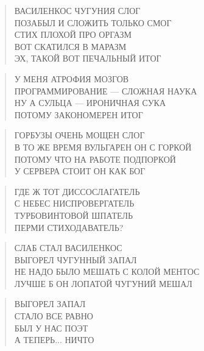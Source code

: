 \poemtitle{***}
\begin{verse}
ВАСИЛЕНКОС ЧУГУНИЯ СЛОГ\\
ПОЗАБЫЛ И СЛОЖИТЬ ТОЛЬКО СМОГ\\
СТИХ ПЛОХОЙ ПРО ОРГАЗМ\\
ВОТ СКАТИЛСЯ В МАРАЗМ\\
ЭХ, ТАКОЙ ВОТ ПЕЧАЛЬНЫЙ ИТОГ
\end{verse}

\poemtitle{***}
\begin{verse}
У МЕНЯ АТРОФИЯ МОЗГОВ\\
ПРОГРАММИРОВАНИЕ — СЛОЖНАЯ НАУКА\\
НУ А СУЛЬЦА — ИРОНИЧНАЯ СУКА\\
ПОТОМУ ЗАКОНОМЕРЕН ИТОГ
\end{verse}

\poemtitle{***}
\begin{verse}
ГОРБУЗЫ ОЧЕНЬ МОЩЕН СЛОГ\\
В ТО ЖЕ ВРЕМЯ ВУЛЬГАРЕН ОН С ГОРКОЙ\\
ПОТОМУ ЧТО НА РАБОТЕ ПОДПОРКОЙ\\
У СЕРВЕРА СТОИТ ОН КАК БОГ
\end{verse}

\poemtitle{***}
\begin{verse}
ГДЕ Ж ТОТ ДИССОСЛАГАТЕЛЬ\\
С НЕБЕС НИСПРОВЕРГАТЕЛЬ\\
ТУРБОВИНТОВОЙ ШПАТЕЛЬ\\
ПЕРМИ СТИХОДАВАТЕЛЬ?
\end{verse}

\poemtitle{***}
\begin{verse}
СЛАБ СТАЛ ВАСИЛЕНКОС\\
ВЫГОРЕЛ ЧУГУННЫЙ ЗАПАЛ\\
НЕ НАДО БЫЛО МЕШАТЬ С КОЛОЙ МЕНТОС\\
ЛУЧШЕ Б ОН ЛОПАТОЙ ЧУГУНИЙ МЕШАЛ
\end{verse}

\poemtitle{***}
\begin{verse}
ВЫГОРЕЛ ЗАПАЛ\\
СТАЛО ВСЕ РАВНО\\
БЫЛ У НАС ПОЭТ\\
А ТЕПЕРЬ... НИЧТО
\end{verse}


